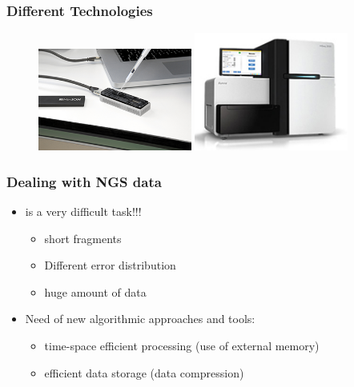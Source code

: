 \begin{frame}\frametitle{Different Technologies}

\begin{figure}[h]
\includegraphics[width=0.45\textwidth]{4130_mini_ion_lab-copy}
\hfill
\includegraphics[width=0.45\textwidth]{illumna-hiseq20002}
\end{figure}
\end{frame}





\begin{frame}\frametitle{Dealing with NGS data}
  \begin{itemize}
  \item
    is a very difficult task!!!
    \begin{itemize}
    \item
      short fragments
    \item
      Different error distribution
    \item
      huge amount of data
    \end{itemize}
  \item
    Need of new algorithmic approaches and tools:
    \begin{itemize}
    \item
      time-space efficient processing (use of external memory)
    \item
      efficient data storage (data compression)
    \end{itemize}
  \end{itemize}
\end{frame}


